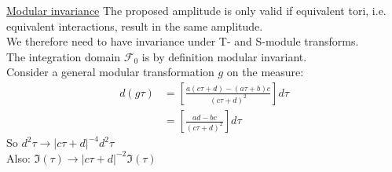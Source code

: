 \documentclass[11pt,aspectratio=169]{beamer}
\begin{document}
\begin{frame}{\underline{Modular invariance}}
	The proposed amplitude is only valid if equivalent tori, i.e. equivalent interactions, result in the same amplitude. 
	\\
	We therefore need to have invariance under T- and S-module transforms.
	\\
	The integration domain $\mathcal{F}_0$ is by definition modular invariant. 
	\\
	Consider a general modular transformation $g$ on the measure:
	\begin{align*}
		d(g\tau) &=  [\frac{a(c\tau + d) - (a\tau + b)c}{(c\tau + d)^2}]d\tau \\
		&= [\frac{ad - bc}{(c\tau + d)^2}]d\tau
	\end{align*}
	So $d^2\tau \rightarrow |c\tau + d|^{-4}d^2\tau$
	\\
	Also: $\Im(\tau) \rightarrow |c\tau + d|^{-2}\Im(\tau)$
	
\end{frame}
\end{document}
